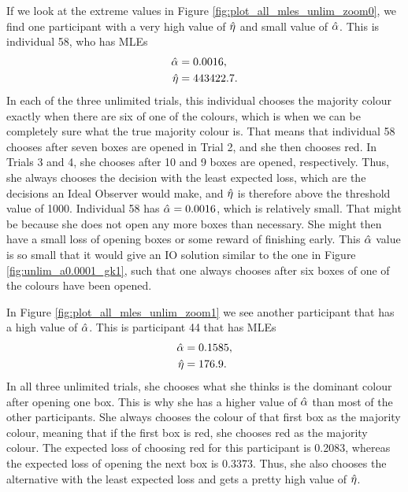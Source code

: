  
If we look at the extreme values in Figure \ref{fig:plot_all_mles_unlim_zoom0}, we find one participant with a very high value of $\hat{\eta}$ and small value of $\hat{\alpha}$. This is individual 58, who has MLEs
\begin{equation}
\label{mles_unlim_person58}
    \begin{aligned}
        \hat{\alpha} &= 0.0016,\\
        \hat{\eta} &= 443422.7.
    \end{aligned}
\end{equation}
In each of the three unlimited trials, this individual chooses the majority colour exactly when there are six of one of the colours, which is when we can be completely sure what the true majority colour is. That means that individual 58 chooses after seven boxes are opened in Trial 2, and she then chooses red. In Trials 3 and 4, she chooses after 10 and 9 boxes are opened, respectively. Thus, she always chooses the decision with the least expected loss, which are the decisions an Ideal Observer would make, and $\hat{\eta}$ is therefore above the threshold value of 1000. Individual 58 has $\hat{\alpha}=0.0016$, which is relatively small. That might be because she does not open any more boxes than necessary. She might then have a small loss of opening boxes or some reward of finishing early. This $\hat{\alpha}$ value is so small that it would give an IO solution similar to the one in Figure \ref{fig:unlim_a0.0001_gk1}, such that one always chooses after six boxes of one of the colours have been opened. 


In Figure \ref{fig:plot_all_mles_unlim_zoom1} we see another participant that has a high value of $\hat{\alpha}$. This is participant 44 that has MLEs
\begin{equation}
\label{mles_unlim_person44}
    \begin{aligned}
        \hat{\alpha} &= 0.1585,\\
        \hat{\eta} &= 176.9.
    \end{aligned}
\end{equation}
In all three unlimited trials, she chooses what she thinks is the dominant colour after opening one box. This is why she has a higher value of $\hat{\alpha}$ than most of the other participants. She always chooses the colour of that first box as the majority colour, meaning that if the first box is red, she chooses red as the majority colour. The expected loss of choosing red for this participant is 0.2083, whereas the expected loss of opening the next box is 0.3373. Thus, she also chooses the alternative with the least expected loss and gets a pretty high value of $\hat{\eta}$.

